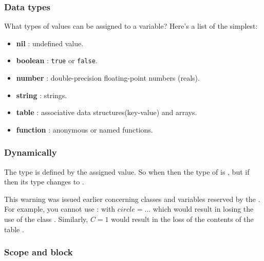 
\subsubsection{Data types} %
\label{ssub:types}
 What types of values can be assigned to a variable? Here's a list of the simplest:

\begin{itemize}
    \item \textbf{nil} : undefined value.
    \item \textbf{boolean} : \texttt{true} or \texttt{false}.
    \item \textbf{number} : double-precision floating-point numbers (reals).
    \item \textbf{string} : strings.
    \item \textbf{table} : associative data structures(key-value) and arrays.
    \item \textbf{function} : anonymous or named functions.
\end{itemize}

\subsubsection{Dynamically} %
\label{ssub:dynamically}
The type is defined by the assigned value. So when  then the type of  is , but if  then its type changes to .

\tkzRBomb This warning was issued earlier concerning classes and variables reserved by the . For example, you cannot use :  with $circle = ...$ which would result in losing the use of the class . Similarly, $C= 1$ would result in the loss of the contents of the table .


\subsubsection{Scope and block} %

\label{ssub:scope}

